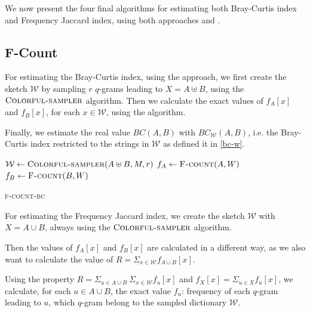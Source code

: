 We now present the four final algorithms for estimating both Bray-Curtis index and Frequency Jaccard index, using both approaches \fcount and \fsamp.

\subsection*{F-Count}

For estimating the Bray-Curtis index, using the \fcount approach, we first create the sketch $\mathcal{W}$ by sampling $r$ $q$-grams leading to $X = A \uplus B$, using the $\textsc{Colorful-sampler}$ algorithm. Then we calculate the exact values of $f_{A}[x]$ and $f_{B}[x]$, for each $x \in \mathcal{W}$, using the \fcount algorithm.

Finally, we estimate the real value $BC(A,B)$ with $BC_{ \mathcal{W} }(A,B)$, i.e. the Bray-Curtis index restricted to the strings in $\mathcal{W}$ as defined it in \eqref{bc-w}.

\begin{algorithm}[h]
	\small
	\DontPrintSemicolon
	\BlankLine
	$\mathcal{W} \gets \textsc{Colorful-sampler}(A \uplus B, M, r)$ \;
	$f_{A} \gets \textsc{F-count}(A, W)$ \;
	$f_{B} \gets \textsc{F-count}(B, W)$ \;
	\BlankLine
	\caption{\textsc{f-count-bc}}
	\label{alg:f-count-bc}
\end{algorithm}

For estimating the Frequency Jaccard index, we create the sketch $\mathcal{W}$ with $X = A \cup B$, always using the $\textsc{Colorful-sampler}$ algorithm. 

Then the values of $f_{A}[x]$ and $f_{B}[x]$ are calculated in a different way, as we also want to calculate the value of $R = \Sigma_{x \in \mathcal{W}} f_{A \cup B}[x]$.

Using the property $R = \Sigma_{u \in A \cup B}\ \Sigma_{x \in \mathcal{W}} f_{u}[x] $ and $f_{X}[x] = \Sigma_{u \in X}{ f_{u}[x] }$, we calculate, for each $u \in A \cup B$, the exact value $f_{u}$: frequency of each $q$-gram leading to $u$, which $q$-gram belong to the sampled dictionary $\mathcal{W}$.

